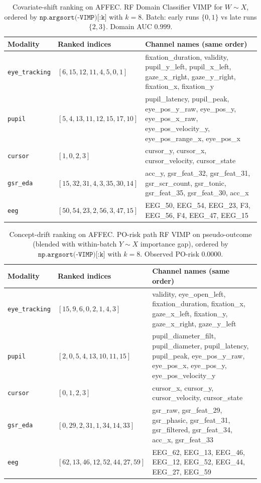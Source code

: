 \begin{table}[ht]
\centering
\caption{Covariate-shift ranking on AFFEC. RF Domain Classifier VIMP for $W\sim X$,
ordered by $\texttt{np.argsort(-VIMP)[:k]}$ with $k=8$. Batch: early runs $\{0,1\}$ vs late runs $\{2,3\}$.
Domain AUC $0.999$.}
\label{tab:affec-fsds-cs-rank}
\small
\begin{tabular}{@{}l l p{7.2cm}@{}}
\toprule
Modality & Ranked indices & Channel names (same order) \\
\midrule
\texttt{eye\_tracking} & $[6,15,12,11,4,5,0,1]$ & fixation\_duration, validity, pupil\_y\_left, pupil\_x\_left, gaze\_x\_right, gaze\_y\_right, fixation\_x, fixation\_y \\
\texttt{pupil} & $[5,4,13,11,12,15,17,10]$ & pupil\_latency, pupil\_peak, eye\_pos\_y\_raw, eye\_pos\_y, eye\_pos\_x\_raw, eye\_pos\_velocity\_y, eye\_pos\_range\_x, eye\_pos\_x \\
\texttt{cursor} & $[1,0,2,3]$ & cursor\_y, cursor\_x, cursor\_velocity, cursor\_state \\
\texttt{gsr\_eda} & $[15,32,31,4,3,35,30,14]$ & acc\_y, gsr\_feat\_32, gsr\_feat\_31, gsr\_scr\_count, gsr\_tonic, gsr\_feat\_35, gsr\_feat\_30, acc\_x \\
\texttt{eeg} & $[50,54,23,2,56,3,47,15]$ & EEG\_50, EEG\_54, EEG\_23, F3, EEG\_56, F4, EEG\_47, EEG\_15 \\
\bottomrule
\end{tabular}
\end{table}

\begin{table}[ht]
\centering
\caption{Concept-drift ranking on AFFEC. PO-risk path RF VIMP on pseudo-outcome
(blended with within-batch $Y\sim X$ importance gap), ordered by $\texttt{np.argsort(-VIMP)[:k]}$ with $k=8$. Observed PO-risk $0.0000$.}
\label{tab:affec-fsds-cd-rank}
\small
\begin{tabular}{@{}l l p{7.2cm}@{}}
\toprule
Modality & Ranked indices & Channel names (same order) \\
\midrule
\texttt{eye\_tracking} & $[15,9,6,0,2,1,4,3]$ & validity, eye\_open\_left, fixation\_duration, fixation\_x, gaze\_x\_left, fixation\_y, gaze\_x\_right, gaze\_y\_left \\
\texttt{pupil} & $[2,0,5,4,13,10,11,15]$ & pupil\_diameter\_filt, pupil\_diameter, pupil\_latency, pupil\_peak, eye\_pos\_y\_raw, eye\_pos\_x, eye\_pos\_y, eye\_pos\_velocity\_y \\
\texttt{cursor} & $[0,1,2,3]$ & cursor\_x, cursor\_y, cursor\_velocity, cursor\_state \\
\texttt{gsr\_eda} & $[0,29,2,31,1,34,14,33]$ & gsr\_raw, gsr\_feat\_29, gsr\_phasic, gsr\_feat\_31, gsr\_filtered, gsr\_feat\_34, acc\_x, gsr\_feat\_33 \\
\texttt{eeg} & $[62,13,46,12,52,44,27,59]$ & EEG\_62, EEG\_13, EEG\_46, EEG\_12, EEG\_52, EEG\_44, EEG\_27, EEG\_59 \\
\bottomrule
\end{tabular}
\end{table}
